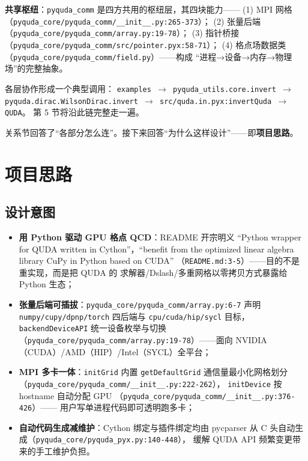 \documentclass[UTF8]{ctexart}
\begin{document}
\textbf{共享枢纽}：\texttt{pyquda\_comm} 是四方共用的枢纽层，其四块能力——
(1) MPI 网格（\texttt{\nolinkurl{pyquda_core/pyquda_comm/__init__.py:265-373}}）；
(2) 张量后端（\texttt{\nolinkurl{pyquda_core/pyquda_comm/array.py:19-78}}）；
(3) 指针桥接（\texttt{\nolinkurl{pyquda_core/pyquda_comm/src/pointer.pyx:58-71}}）；
(4) 格点场数据类（\texttt{\nolinkurl{pyquda_core/pyquda_comm/field.py}}）——构成
“进程→设备→内存→物理场”的完整抽象。

各层协作形成一个典型调用：
\textcolor{relation}{\texttt{examples $\rightarrow$ \nolinkurl{pyquda_utils.core.invert}
$\rightarrow$ \nolinkurl{pyquda.dirac.WilsonDirac.invert} $\rightarrow$
\nolinkurl{src/quda.in.pyx:invertQuda} $\rightarrow$ QUDA}}。
第 5 节将沿此链完整走一遍。

关系节回答了“各部分怎么连”。接下来回答“为什么这样设计”——即\textbf{项目思路}。

\section{项目思路}

\subsection{设计意图}
\begin{itemize}
  \item \textcolor{idea}{\textbf{用 Python 驱动 GPU 格点 QCD}}：README 开宗明义
        “Python wrapper for QUDA written in Cython”，“benefit from the optimized
        linear algebra library CuPy in Python based on CUDA”
        （\texttt{\nolinkurl{README.md:3-5}}）——目的不是重实现，而是把 QUDA 的
        求解器/Dslash/多重网格以零拷贝方式暴露给 Python 生态；
  \item \textcolor{idea}{\textbf{张量后端可插拔}}：\texttt{\nolinkurl{pyquda_core/pyquda_comm/array.py:6-7}}
        声明 \texttt{numpy/cupy/dpnp/torch} 四后端与 \texttt{cpu/cuda/hip/sycl} 目标，
        \texttt{backendDeviceAPI} 统一设备枚举与切换
        （\texttt{\nolinkurl{pyquda_core/pyquda_comm/array.py:19-78}}）——面向
        NVIDIA（CUDA）/AMD（HIP）/Intel（SYCL）全平台；
  \item \textcolor{idea}{\textbf{MPI 多卡一体}}：\texttt{initGrid} 内置
        \texttt{getDefaultGrid} 通信量最小化网格划分
        （\texttt{\nolinkurl{pyquda_core/pyquda_comm/__init__.py:222-262}}），
        \texttt{initDevice} 按 hostname 自动分配 GPU
        （\texttt{\nolinkurl{pyquda_core/pyquda_comm/__init__.py:376-426}}）——
        用户写单进程代码即可透明跑多卡；
  \item \textcolor{idea}{\textbf{自动代码生成减维护}}：Cython 绑定与插件绑定均由
        pycparser 从 C 头自动生成（\texttt{\nolinkurl{pyquda_core/pyquda_pyx.py:140-448}}），
        缓解 QUDA API 频繁变更带来的手工维护负担。
\end{itemize}
\end{document}
